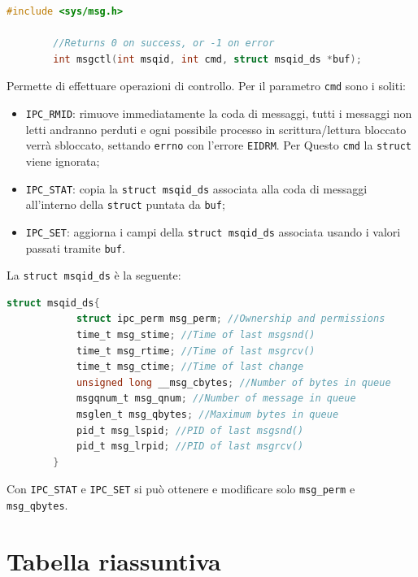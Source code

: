 \documentclass[a4paper, 12pt]{book}
\begin{document}
    \begin{lstlisting}[language=C]
        #include <sys/msg.h>

        //Returns 0 on success, or -1 on error 
        int msgctl(int msqid, int cmd, struct msqid_ds *buf);
    \end{lstlisting}
    Permette di effettuare operazioni di controllo. 
    Per il parametro \verb|cmd| sono i soliti:
    \begin{itemize}
        \item \verb|IPC_RMID|: rimuove immediatamente 
        la coda di messaggi, tutti i messaggi non letti 
        andranno perduti e ogni possibile processo in 
        scrittura/lettura bloccato verrà sbloccato, settando 
        \verb|errno| con l'errore \verb|EIDRM|. Per Questo
        \verb|cmd| la \verb|struct| viene ignorata;
        \item \verb|IPC_STAT|: copia la \verb|struct msqid_ds| 
        associata alla coda di messaggi all'interno della 
        \verb|struct| puntata da \verb|buf|;
        \item \verb|IPC_SET|: aggiorna i campi della \verb|struct msqid_ds| 
        associata usando i valori passati tramite \verb|buf|.
    \end{itemize}
    La \verb|struct msqid_ds| è la seguente:
    \begin{lstlisting}[language=C]
        struct msqid_ds{
            struct ipc_perm msg_perm; //Ownership and permissions 
            time_t msg_stime; //Time of last msgsnd() 
            time_t msg_rtime; //Time of last msgrcv() 
            time_t msg_ctime; //Time of last change 
            unsigned long __msg_cbytes; //Number of bytes in queue 
            msgqnum_t msg_qnum; //Number of message in queue 
            msglen_t msg_qbytes; //Maximum bytes in queue 
            pid_t msg_lspid; //PID of last msgsnd() 
            pid_t msg_lrpid; //PID of last msgrcv()
        }
    \end{lstlisting}
    Con \verb|IPC_STAT| e \verb|IPC_SET| si può ottenere 
    e modificare solo \verb|msg_perm| e \verb|msg_qbytes|.
    
    \section{Tabella riassuntiva}
    
\end{document}
